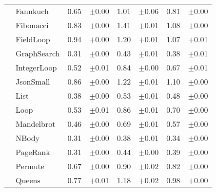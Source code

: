 \begin{tabular}{ll@{\hspace{6pt}}r@{\hspace{3pt}}l@{\hspace{6pt}}r@{\hspace{3pt}}l@{\hspace{6pt}}r@{\hspace{3pt}}l}
 & Fannkuch & 0.65 & \scriptsize\textcolor{gray!60}{$\pm$0.00} & 1.01 & \scriptsize\textcolor{gray!60}{$\pm$0.06} & 0.81 & \scriptsize\textcolor{gray!60}{$\pm$0.00} \\
 & Fibonacci & 0.83 & \scriptsize\textcolor{gray!60}{$\pm$0.00} & 1.41 & \scriptsize\textcolor{gray!60}{$\pm$0.01} & 1.08 & \scriptsize\textcolor{gray!60}{$\pm$0.00} \\
 & FieldLoop & 0.94 & \scriptsize\textcolor{gray!60}{$\pm$0.00} & 1.20 & \scriptsize\textcolor{gray!60}{$\pm$0.01} & 1.07 & \scriptsize\textcolor{gray!60}{$\pm$0.01} \\
 & GraphSearch & 0.31 & \scriptsize\textcolor{gray!60}{$\pm$0.00} & 0.43 & \scriptsize\textcolor{gray!60}{$\pm$0.01} & 0.38 & \scriptsize\textcolor{gray!60}{$\pm$0.01} \\
 & IntegerLoop & 0.52 & \scriptsize\textcolor{gray!60}{$\pm$0.01} & 0.84 & \scriptsize\textcolor{gray!60}{$\pm$0.00} & 0.67 & \scriptsize\textcolor{gray!60}{$\pm$0.01} \\
 & JsonSmall & 0.86 & \scriptsize\textcolor{gray!60}{$\pm$0.00} & 1.22 & \scriptsize\textcolor{gray!60}{$\pm$0.01} & 1.10 & \scriptsize\textcolor{gray!60}{$\pm$0.00} \\
 & List & 0.38 & \scriptsize\textcolor{gray!60}{$\pm$0.00} & 0.53 & \scriptsize\textcolor{gray!60}{$\pm$0.01} & 0.48 & \scriptsize\textcolor{gray!60}{$\pm$0.00} \\
 & Loop & 0.53 & \scriptsize\textcolor{gray!60}{$\pm$0.01} & 0.86 & \scriptsize\textcolor{gray!60}{$\pm$0.01} & 0.70 & \scriptsize\textcolor{gray!60}{$\pm$0.00} \\
 & Mandelbrot & 0.46 & \scriptsize\textcolor{gray!60}{$\pm$0.00} & 0.69 & \scriptsize\textcolor{gray!60}{$\pm$0.01} & 0.57 & \scriptsize\textcolor{gray!60}{$\pm$0.00} \\
 & NBody & 0.31 & \scriptsize\textcolor{gray!60}{$\pm$0.00} & 0.38 & \scriptsize\textcolor{gray!60}{$\pm$0.01} & 0.34 & \scriptsize\textcolor{gray!60}{$\pm$0.00} \\
 & PageRank & 0.31 & \scriptsize\textcolor{gray!60}{$\pm$0.00} & 0.44 & \scriptsize\textcolor{gray!60}{$\pm$0.00} & 0.39 & \scriptsize\textcolor{gray!60}{$\pm$0.00} \\
 & Permute & 0.67 & \scriptsize\textcolor{gray!60}{$\pm$0.00} & 0.90 & \scriptsize\textcolor{gray!60}{$\pm$0.02} & 0.82 & \scriptsize\textcolor{gray!60}{$\pm$0.00} \\
 & Queens & 0.77 & \scriptsize\textcolor{gray!60}{$\pm$0.01} & 1.18 & \scriptsize\textcolor{gray!60}{$\pm$0.02} & 0.98 & \scriptsize\textcolor{gray!60}{$\pm$0.00} \\

\end{tabular}
